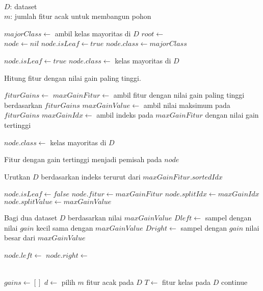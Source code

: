 \begin{center}
	\label{alg:cart}
	\begin{algorithmic}[1]

\Require \\
$D$: dataset \\
$m$: jumlah fitur acak untuk membangun pohon

	\State $ majorClass \gets $ ambil kelas mayoritas di $ D $
	\State $ root \gets $ 
	\State {}
\EndFunction
\\
	\State $ node \gets nil $
		\State $ node.isLeaf \gets true $
		\State $ node.class \gets majorClass $
		\State {}
	\EndIf

		\State $ node.isLeaf \gets true $
		\State $ node.class \gets $ kelas mayoritas di $ D $
		\State {}
	\EndIf

	\Comment Hitung fitur dengan nilai gain paling tinggi.

	\State $ fiturGains \gets $ 
	\State $ maxGainFitur \gets $ ambil fitur dengan nilai gain paling tinggi
	berdasarkan $fiturGains$
	\State $ maxGainValue \gets $ ambil nilai maksimum pada $fiturGains$
	\State $ maxGainIdx \gets $ ambil indeks pada $maxGainFitur$ dengan
	nilai gain tertinggi

		\State $ node.class \gets $ kelas mayoritas di $ D $
		\State {}
	\EndIf

	\Comment Fitur dengan gain tertinggi menjadi pemisah pada $node$

	\State Urutkan $ D $ berdasarkan indeks terurut dari $maxGainFitur.sortedIdx$

	\State $ node.isLeaf \gets false $
	\State $ node.fitur \gets maxGainFitur $
	\State $ node.splitIdx \gets maxGainIdx $
	\State $ node.splitValue \gets maxGainValue $

	\Comment Bagi dua dataset $D$ berdasarkan nilai $maxGainValue$
	\State $ Dleft \gets $ sampel dengan nilai $gain$ kecil sama dengan
	$maxGainValue$
	\State $ Dright \gets $ sampel dengan $gain$ nilai besar dari
	$maxGainValue$

	\State $ node.left \gets $ 
	\State $ node.right \gets $ 

	\State {}
\EndFunction
\\
	\State $ gains \gets [] $
	\State $ d \gets $ pilih $m$ fitur acak pada $D$
	\State $ T \gets $ fitur kelas pada $D$
			\State continue
		\EndIf


\end{algorithmic}
\end{center}
